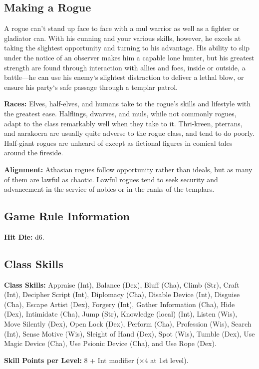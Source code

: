\subsection{Making a Rogue}

A rogue can't stand up face to face with a mul warrior as well as a fighter or gladiator can. With his cunning and your various skills, however, he excels at taking the slightest opportunity and turning to his advantage. His ability to slip under the notice of an observer makes him a capable lone hunter, but his greatest strength are found through interaction with allies and foes, inside or outside, a battle—he can use his enemy`s slightest distraction to deliver a lethal blow, or ensure his party`s safe passage through a templar patrol.

\textbf{Races:} Elves, half-elves, and humans take to the rogue's skills and lifestyle with the greatest ease. Halflings, dwarves, and muls, while not commonly rogues, adapt to the class remarkably well when they take to it. Thri-kreen, pterrans, and aarakocra are usually quite adverse to the rogue class, and tend to do poorly. Half-giant rogues are unheard of except as fictional figures in comical tales around the fireside.

\textbf{Alignment:} Athasian rogues follow opportunity rather than ideals, but as many of them are lawful as chaotic. Lawful rogues tend to seek security and advancement in the service of nobles or in the ranks of the templars.

\subsection{Game Rule Information}
\textbf{Hit Die:} d6.

\subsection{Class Skills}
\textbf{Class Skills:} Appraise (Int), Balance (Dex), Bluff (Cha), Climb (Str), Craft (Int), Decipher Script (Int), Diplomacy (Cha), Disable Device (Int), Disguise (Cha), Escape Artist (Dex), Forgery (Int), Gather Information (Cha), Hide (Dex), Intimidate (Cha), Jump (Str), Knowledge (local) (Int), Listen (Wis), Move Silently (Dex), Open Lock (Dex), Perform (Cha), Profession (Wis), Search (Int), Sense Motive (Wis), Sleight of Hand (Dex), Spot (Wis), Tumble (Dex), Use Magic Device (Cha), Use Psionic Device (Cha), and Use Rope (Dex).

\textbf{Skill Points per Level:} 8 + Int modifier ($\times4$ at 1st level).

